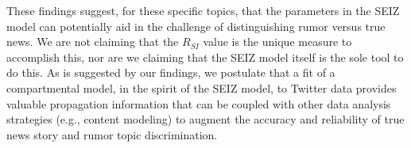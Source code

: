These findings suggest, for these specific topics, that the parameters in the SEIZ model can potentially aid in the challenge of distinguishing rumor versus true news. We are not claiming that the $R_{SI}$ value is the unique measure to accomplish this, nor are we claiming that the SEIZ model itself is the sole tool to do this. As is suggested by our findings, we postulate that a fit of a compartmental model, in the spirit of the SEIZ model, to Twitter data provides valuable propagation information that can be coupled with other data analysis strategies  (e.g., content modeling)
to augment the accuracy and reliability of true news story and rumor topic discrimination.




%
%
